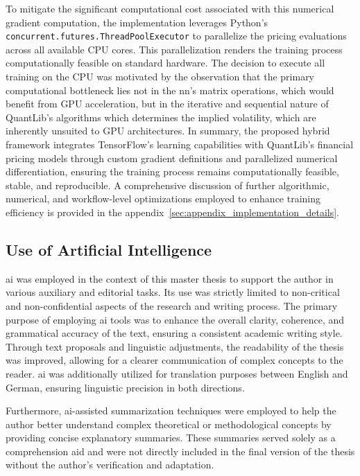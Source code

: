 To mitigate the significant computational cost associated with this numerical gradient computation, the implementation leverages Python's \texttt{concurrent.futures.ThreadPoolExecutor} to parallelize the pricing evaluations across all available CPU cores. This parallelization renders the training process computationally feasible on standard hardware. The decision to execute all training on the CPU was motivated by the observation that the primary computational bottleneck lies not in the \ac{nn}'s matrix operations, which would benefit from GPU acceleration, but in the iterative and sequential nature of QuantLib's algorithms which determines the implied volatility, which are inherently unsuited to GPU architectures. In summary, the proposed hybrid framework integrates TensorFlow's learning capabilities with QuantLib's financial pricing models through custom gradient definitions and parallelized numerical differentiation, ensuring the training process remains computationally feasible, stable, and reproducible. A comprehensive discussion of further algorithmic, numerical, and workflow-level optimizations employed to enhance training efficiency is provided in the appendix~\ref{sec:appendix_implementation_details}.

\subsection{Use of Artificial Intelligence}
\ac{ai} was employed in the context of this master thesis to support the author in various auxiliary and editorial tasks. Its use was strictly limited to non-critical and non-confidential aspects of the research and writing process. The primary purpose of employing \ac{ai} tools was to enhance the overall clarity, coherence, and grammatical accuracy of the text, ensuring a consistent academic writing style. Through text proposals and linguistic adjustments, the readability of the thesis was improved, allowing for a clearer communication of complex concepts to the reader. \ac{ai} was additionally utilized for translation purposes between English and German, ensuring linguistic precision in both directions.

Furthermore, \ac{ai}-assisted summarization techniques were employed to help the author better understand complex theoretical or methodological concepts by providing concise explanatory summaries. These summaries served solely as a comprehension aid and were not directly included in the final version of the thesis without the author's verification and adaptation.

